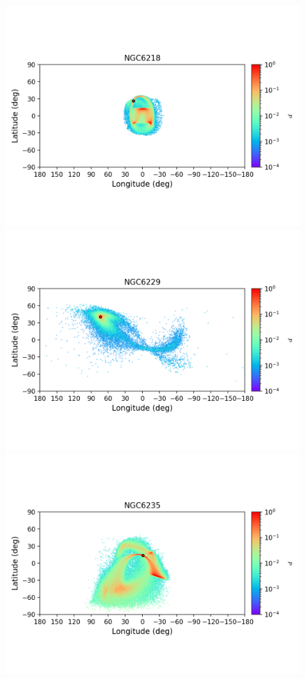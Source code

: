 \begin{figure}
        \includegraphics[clip=true, trim = 0mm 20mm 0mm 10mm, width=1\columnwidth]{images/error_plots_NGC6218.png}
        \includegraphics[clip=true, trim = 0mm 20mm 0mm 10mm, width=1\columnwidth]{images/error_plots_NGC6229.png}
        \includegraphics[clip=true, trim = 0mm 20mm 0mm 10mm, width=1\columnwidth]{images/error_plots_NGC6235.png}

\end{figure}
